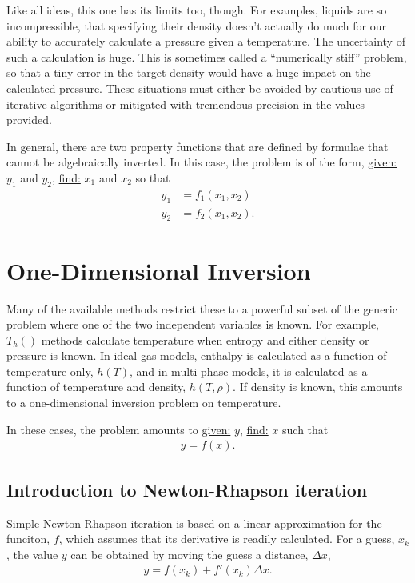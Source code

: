 \documentclass{article}
\begin{document}
Like all ideas, this one has its limits too, though.  For examples, liquids are so incompressible, that specifying their density doesn't actually do much for our ability to accurately calculate a pressure given a temperature.  The uncertainty of such a calculation is huge.  This is sometimes called a ``numerically stiff'' problem, so that a tiny error in the target density would have a huge impact on the calculated pressure.  These situations must either be avoided by cautious use of iterative algorithms or mitigated with tremendous precision in the values provided.  

In general, there are two property functions that are defined by formulae that cannot be algebraically inverted.  In this case, the problem is of the form, \underline{given:} $y_1$ and $y_2$, \underline{find:} $x_1$ and $x_2$ so that
\begin{align}
y_1 &= f_1(x_1, x_2)\\
y_2 &= f_2(x_1, x_2).
\end{align}


\section{One-Dimensional Inversion}

Many of the available methods restrict these to a powerful subset of the generic problem where one of the two independent variables is known.  For example, $T_h()$ methods calculate temperature when entropy and either density or pressure is known.  In ideal gas models, enthalpy is calculated as a function of temperature only, $h(T)$, and in multi-phase models, it is calculated as a function of temperature and density, $h(T,\rho)$.  If density is known, this amounts to a one-dimensional inversion problem on temperature.

In these cases, the problem amounts to \underline{given:} $y$, \underline{find:} $x$ such that
\begin{align}
y = f(x).
\end{align}

\subsection{Introduction to Newton-Rhapson iteration}

Simple Newton-Rhapson iteration is based on a linear approximation for the funciton, $f$, which assumes that its derivative is readily calculated.  For a guess, $x_k$, the value $y$ can be obtained by moving the guess a distance, $\Delta x$,
\begin{align}
y = f(x_k) + f'(x_k) \Delta x.
\end{align}
\end{document}

